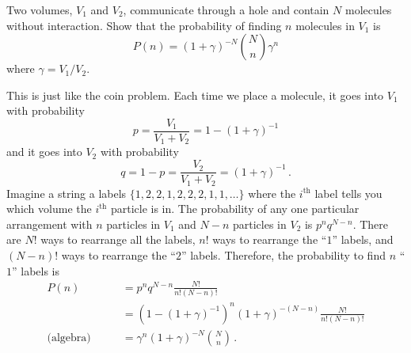 

Two volumes, $V_1$ and $V_2$, communicate through a hole and contain $N$ molecules without interaction.
Show that the probability of finding $n$ molecules in $V_1$ is
\begin{equation*}
P(n) = (1 + \gamma)^{-N} \binom{N}{n} \gamma^n
\end{equation*}
where $\gamma = V_1 / V_2$.


This is just like the coin problem.
Each time we place a molecule, it goes into $V_1$ with probability
\begin{equation*}
p = \frac{V_1}{V_1 + V_2} = 1 - (1 + \gamma)^{-1}
\end{equation*}
and it goes into $V_2$ with probability
\begin{equation*}
q = 1 - p = \frac{V_2}{V_1 + V_2} = (1 + \gamma)^{-1} \, .
\end{equation*}
Imagine a string a labels $\{1, 2, 2, 1, 2, 2, 2, 1, 1,\ldots\}$ where the $i^\text{th}$ label tells you which volume the $i^\text{th}$ particle is in.
The probability of any one particular arrangement with $n$ particles in $V_1$ and $N-n$ particles in $V_2$ is $p^n q^{N-n}$.
There are $N!$ ways to rearrange all the labels, $n!$ ways to rearrange the ``$1$'' labels, and $(N-n)!$ ways to rearrange the ``$2$'' labels.
Therefore, the probability to find $n$ ``$1$'' labels is
\begin{align*}
P(n)
&= p^n q^{N-n} \frac{N!}{n! (N-n)!} \\
&= (1 - (1 + \gamma)^{-1})^n (1 + \gamma)^{-(N-n)} \frac{N!}{n! (N-n)!} \\
\text{(algebra)} \qquad &= \gamma^n (1+\gamma)^{-N} \binom{N}{n} \, .
\end{align*}
